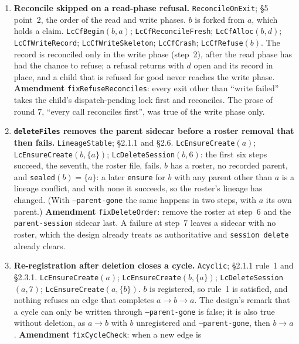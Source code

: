 \documentclass[a4paper,10pt,fleqn]{article}
\newcommand{\fpath}[1]{\texttt{#1}}
\newcommand{\field}[1]{\texttt{#1}}
\begin{document}
\begin{enumerate}
  \item[\textbf{C1}] \textbf{Reconcile skipped on a read-phase refusal.}
    \field{ReconcileOnExit}; \S5 point~2, the order of the read and write
    phases. $b$ is forked from $a$, which holds a claim. \field{LcCfBegin}$(b,a)$;
    \field{LcCfReconcileFresh}; \field{LcCfAlloc}$(b,d)$; \field{LcCfWriteRecord};
    \field{LcCfWriteSkeleton}; \field{LcCfCrash}; \field{LcCfRefuse}$(b)$.
    The record is reconciled only in the write phase (step~2), after the read
    phase has had the chance to refuse; a refusal returns with $d$ open and
    its record in place, and a child that is refused for good never reaches
    the write phase. \textbf{Amendment} \field{fixRefuseReconciles}: every exit
    other than ``write failed'' takes the child's dispatch-pending lock first
    and reconciles. The prose of round 7, ``every call reconciles first'',
    was true of the write phase only.
  \item[\textbf{C2}] \textbf{\field{deleteFiles} removes the parent sidecar
    before a roster removal that then fails.} \field{LineageStable};
    \S2.1.1 and \S2.6. \field{LcEnsureCreate}$(a)$; \field{LcEnsureCreate}$(b,\{a\})$;
    \field{LcDeleteSession}$(b,6)$: the first six steps succeed, the seventh, the
    roster file, fails. $b$ has a roster, no recorded parent, and
    \field{sealed}$(b)=\{a\}$: a later \field{ensure} for $b$ with any parent
    other than $a$ is a lineage conflict, and with none it succeeds, so the
    roster's lineage has changed. (With \field{--parent-gone} the same
    happens in two steps, with $a$ its own parent.) \textbf{Amendment}
    \field{fixDeleteOrder}: remove the roster at step~6 and the
    \fpath{parent-session} sidecar last. A failure at step~7 leaves a sidecar
    with no roster, which the design already treats as authoritative and
    \field{session delete} already clears.
  \item[\textbf{C3}] \textbf{Re-registration after deletion closes a cycle.}
    \field{Acyclic}; \S2.1.1 rule~1 and \S2.3.1. \field{LcEnsureCreate}$(a)$;
    \field{LcEnsureCreate}$(b,\{a\})$; \field{LcDeleteSession}$(a,7)$;
    \field{LcEnsureCreate}$(a,\{b\})$. $b$ is registered, so rule~1 is
    satisfied, and nothing refuses an edge that completes $a\to b\to a$. The
    design's remark that a cycle can only be written through
    \field{--parent-gone} is false; it is also true without deletion, as
    $a\to b$ with $b$ unregistered and \field{--parent-gone}, then
    $b\to a$. \textbf{Amendment} \field{fixCycleCheck}: when a new edge is

\end{enumerate}
\end{document}

